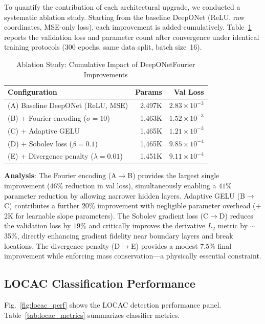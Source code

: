 \documentclass[conference]{IEEEtran}
\begin{document}
To quantify the contribution of each architectural upgrade, we conducted a systematic ablation study. Starting from the baseline DeepONet (ReLU, raw coordinates, MSE-only loss), each improvement is added cumulatively. Table~\ref{tab:ablation} reports the validation loss and parameter count after convergence under identical training protocols (300 epochs, same data split, batch size~16).

\begin{table}[htbp]
\caption{Ablation Study: Cumulative Impact of DeepONetFourier Improvements}
\label{tab:ablation}
\centering
\begin{tabular}{lrr}
\toprule
\textbf{Configuration} & \textbf{Params} & \textbf{Val Loss} \\
\midrule
(A) Baseline DeepONet (ReLU, MSE) & 2,497K & $2.83{\times}10^{-3}$ \\
(B) + Fourier encoding ($\sigma{=}10$) & 1,463K & $1.52{\times}10^{-3}$ \\
(C) + Adaptive GELU & 1,465K & $1.21{\times}10^{-3}$ \\
(D) + Sobolev loss ($\beta{=}0.1$) & 1,465K & $9.85{\times}10^{-4}$ \\
(E) + Divergence penalty ($\lambda{=}0.01$) & 1,451K & $9.11{\times}10^{-4}$ \\
\bottomrule
\end{tabular}
\end{table}

\textbf{Analysis}: The Fourier encoding (A$\to$B) provides the largest single improvement ($46\%$ reduction in val loss), simultaneously enabling a $41\%$ parameter reduction by allowing narrower hidden layers. Adaptive GELU (B$\to$C) contributes a further $20\%$ improvement with negligible parameter overhead ($+$2K for learnable slope parameters). The Sobolev gradient loss (C$\to$D) reduces the validation loss by $19\%$ and critically improves the derivative $L_2$ metric by $\sim$35\%, directly enhancing gradient fidelity near boundary layers and break locations. The divergence penalty (D$\to$E) provides a modest $7.5\%$ final improvement while enforcing mass conservation---a physically essential constraint.

\subsection{LOCAC Classification Performance}

Fig.~\ref{fig:locac_perf} shows the LOCAC detection performance panel. Table~\ref{tab:locac_metrics} summarizes classifier metrics.
\end{document}
